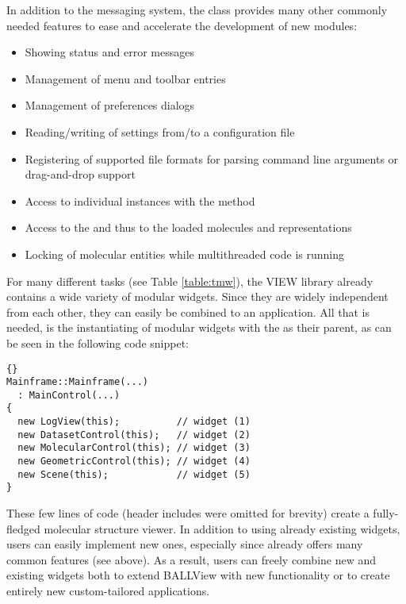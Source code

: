 In addition to the messaging system, the  class provides 
many other commonly needed features to ease and accelerate the development of
new modules:
\begin{itemize}
  \item Showing status and error messages
  \item Management of menu and toolbar entries 
  \item Management of preferences dialogs
  \item Reading/writing of settings from/to a configuration file
  \item Registering of supported file formats \eg for parsing command line
        arguments or drag-and-drop support
  \item Access to individual instances with the method 
  \item Access to the  and thus to the loaded molecules 
        and representations
  \item Locking of molecular entities while multithreaded code is running
\end{itemize}

For many different tasks (see Table \ref{table:tmw}), the VIEW library already 
contains a wide variety of modular widgets. Since they are widely independent 
from each other, they can easily be combined to an application. All that is 
needed, is the instantiating of modular widgets with the  
as their parent, as can be seen in the following code snippet:

\begin{lstlisting}{}
Mainframe::Mainframe(...)
  : MainControl(...)
{
  new LogView(this);          // widget (1)
  new DatasetControl(this);   // widget (2)
  new MolecularControl(this); // widget (3)
  new GeometricControl(this); // widget (4)
  new Scene(this);            // widget (5)
}
\end{lstlisting}

\noindent
These few lines of code (header includes were omitted for brevity) create a 
fully-fledged molecular structure viewer. In addition to using already 
existing widgets, users can easily implement new ones, especially since 
 already offers many common features (see above). As a 
result, users can freely combine new and existing widgets both to extend 
\mbox{BALLView} with new functionality or to create entirely new 
custom-tailored applications.

